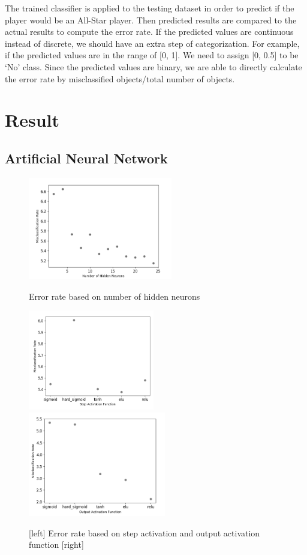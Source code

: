 \documentclass{article}
\begin{document}
The trained classifier is applied to the testing dataset in order to predict if the player would be an All-Star player. Then predicted results are compared to the actual results to compute the error rate. If the predicted values are continuous instead of discrete, we should have an extra step of categorization. For example, if the predicted values are in the range of [0, 1]. We need to assign [0, 0.5] to be ‘No’ class. Since the predicted values are binary, we are able to directly calculate the error rate by misclassified objects/total number of objects.


\section{Result}
\subsection{Artificial Neural Network}
\begin{figure}
  \centering
  \includegraphics[width=6.3cm]{ann_hidden.png}
  \caption{Error rate based on number of hidden neurons}
  \includegraphics[width=5.5cm]{ann_step.png}
  \includegraphics[width=6cm]{ann_output.png}
  \caption{[left] Error rate based on step activation and output activation function [right]}
\end{figure}
\end{document}
